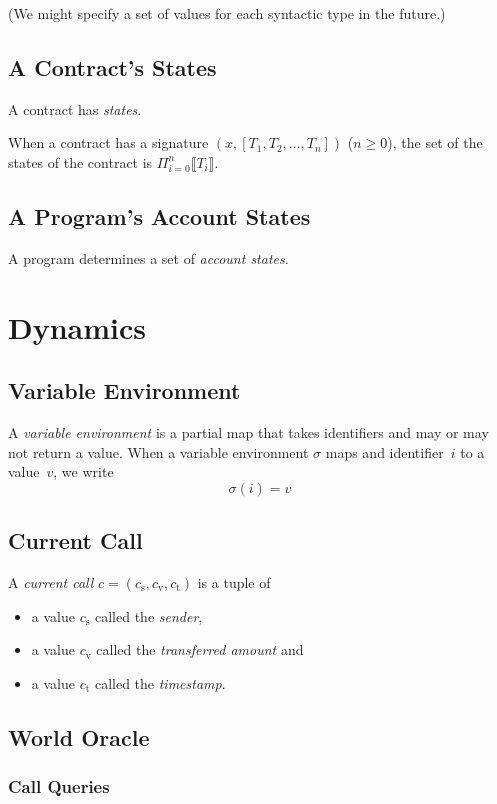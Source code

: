 \documentclass{book}
\newcommand{\sem}[1]{\llbracket{#1}\rrbracket}
\begin{document}
(We might specify a set of values for each syntactic type in the future.)

\subsection{A Contract's States}
A contract has \textit{states}.

When a contract has a signature $(x, [T_1, T_2, \ldots, T_n])$ ($n \ge 0$),
the set of the states of the contract is
$\Pi_{i = 0}^{n} \sem{T_i}$.

\subsection{A Program's Account States}
A program determines a set of \textit{account states}.

\section{Dynamics}

\subsection{Variable Environment}

A \textit{variable environment} is a partial map that takes identifiers and may or may not return a value.  When a variable environment $\sigma$ maps and identifier~$i$ to a value~$v$, we write
\[
\sigma(i) = v
\]

\subsection{Current Call}

A \textit{current call} $c = (c_\mathrm{s}, c_\mathrm{v}, c_\mathrm{t})$ is a tuple of
\begin{itemize}
\item a value $c_\mathrm{s}$ called the \textit{sender},
\item a value $c_\mathrm{v}$ called the \textit{transferred amount} and
\item a value $c_\mathrm{t}$ called the \textit{timestamp}.
\end{itemize}

\subsection{World Oracle}

\subsubsection{Call Queries}
\end{document}
